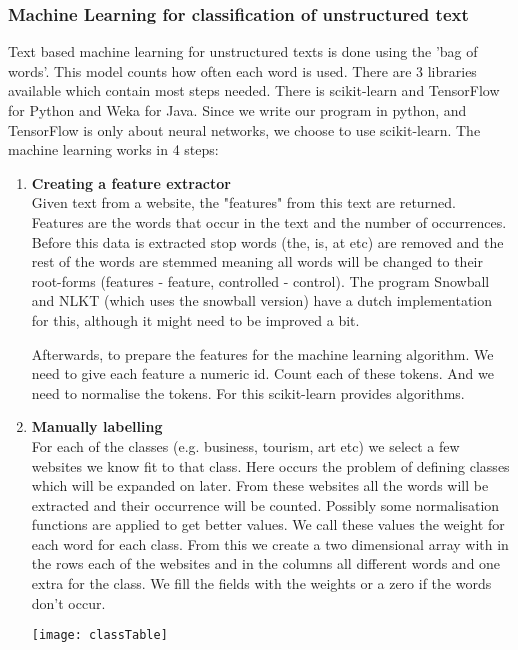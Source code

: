 \subsubsection{Machine Learning for classification of unstructured text}
Text based machine learning for unstructured texts is done using the 'bag of words'. This model counts how often each word is used. There are 3 libraries available which contain most steps needed. There is scikit-learn \cite{scikit-learn} and TensorFlow \cite{tensorFlow} for Python and Weka \cite{weka} for Java. Since we write our program in python, and TensorFlow is only about neural networks, we choose to use scikit-learn.
The machine learning works in 4 steps:
\begin{enumerate}
    \item \textbf{Creating a feature extractor} \\
    Given text from a website, the "features" from this text are returned. Features are the words that occur in the text and the number of occurrences. Before this data is extracted stop words (the, is, at etc) are removed and the rest of the words are stemmed meaning all words will be changed to their root-forms (features - feature, controlled - control). The program Snowball \cite{snowball_dutch} and NLKT \cite{nlkt_stemming} (which uses the snowball version) have a dutch implementation for this, although it might need to be improved a bit.
    
    Afterwards, to prepare the features for the machine learning algorithm. We need to give each feature a numeric id. Count each of these tokens. And we need to normalise the tokens. For this scikit-learn provides algorithms.
    \item \textbf{Manually labelling} \\
    For each of the classes (e.g. business, tourism, art etc) we select a few websites we know fit to that class. Here occurs the problem of defining classes which will be expanded on later. From these websites all the words will be extracted and their occurrence will be counted. Possibly some normalisation functions are applied to get better values. We call these values the weight for each word for each class. From this we create a two dimensional array with in the rows each of the websites and in the columns all different words and one extra for the class. We fill the fields with the weights or a zero if the words don't occur.
    
    \texttt{[image: classTable]}
    

\end{enumerate}
